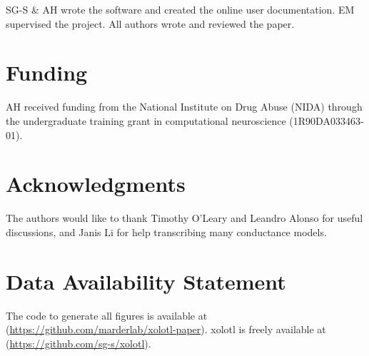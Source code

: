 \documentclass{frontiersSCNS} %
\begin{document}
SG-S \& AH wrote the software and created the online user documentation. EM supervised the project. All authors wrote and reviewed the paper.

\section*{Funding}

AH received funding from the National Institute on Drug Abuse (NIDA) through the undergraduate training grant in computational neuroscience (1R90DA033463-01).

\section*{Acknowledgments}
The authors would like to thank Timothy O'Leary and Leandro Alonso for useful discussions, and Janis Li for help transcribing many conductance models.

\section*{Data Availability Statement}

The code to generate all figures is available at (\url{https://github.com/marderlab/xolotl-paper}). xolotl is freely available at (\url{https://github.com/sg-s/xolotl}).

%
%
%
%
%
%

\printbibliography

%
%
%
%
%
%


\end{document}
